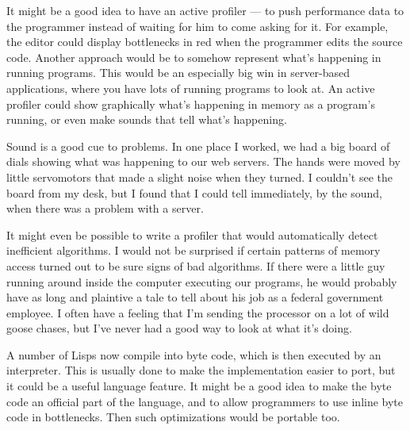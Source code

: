 It might be a good idea
                  to have an active profiler --- to push performance data to
                  the programmer instead of waiting for him to come asking for
                  it. For example, the editor could display bottlenecks in red
                  when the programmer edits the source code. Another approach
                  would be to somehow represent what's happening in running
                  programs. This would be an especially big win in server-based
                  applications, where you have lots of running programs to look
                  at. An active profiler could show graphically what's happening
                  in memory as a program's running, or even make sounds that
                  tell what's happening.

Sound is a good cue to
                  problems. In one place I worked, we had a big board of dials
                  showing what was happening to our web servers. The hands were
                  moved by little servomotors that made a slight noise when they
                  turned. I couldn't see the board from my desk, but I found
                  that I could tell immediately, by the sound, when there was a
                  problem with a server.

It might even be possible to
                  write a profiler that would automatically detect inefficient
                  algorithms. I would not be surprised if certain patterns of
                  memory access turned out to be sure signs of bad algorithms.
                  If there were a little guy running around inside the computer
                  executing our programs, he would probably have as long and
                  plaintive a tale to tell about his job as a federal government
                  employee. I often have a feeling that I'm sending the
                  processor on a lot of wild goose chases, but I've never had a
                  good way to look at what it's doing.

A number of
                  Lisps now compile into byte code, which is then executed by an
                  interpreter. This is usually done to make the implementation
                  easier to port, but it could be a useful language feature. It
                  might be a good idea to make the byte code an official part of
                  the language, and to allow programmers to use inline byte code
                  in bottlenecks. Then such optimizations would be portable
                  too.

